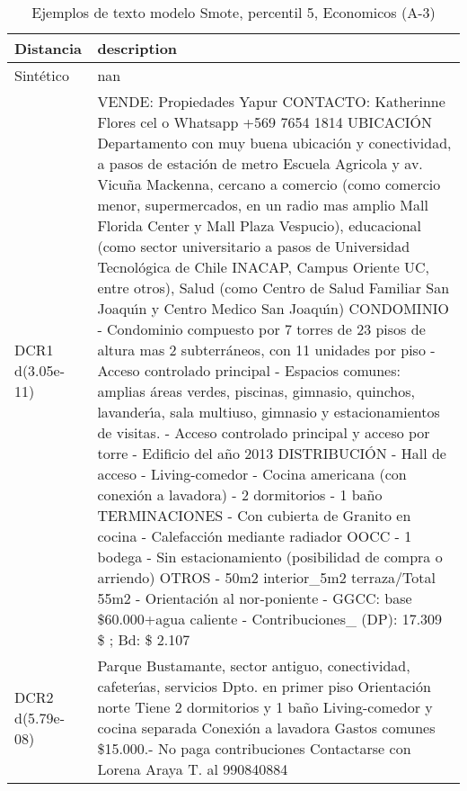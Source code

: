 \begin{table}[H]
\centering
\fontsize{10}{14}\selectfont
\caption{Ejemplos de texto modelo Smote, percentil 5, Economicos (A-3)}
\label{table-example-economicos-a-3-smote-enc-5p-text}
\begin{tabular}{|l|m{35em}|}
\hline
\rowcolor[gray]{0.8}
Distancia & description \\
\hline Sintético & nan \\
\hline DCR1 d(3.05e-11) & VENDE: Propiedades Yapur CONTACTO: Katherinne Flores cel o Whatsapp +569 7654 1814  UBICACI\'ON Departamento con muy buena ubicaci\'on y conectividad, a pasos de estaci\'on de metro Escuela Agricola y av. Vicu\~na Mackenna, cercano a comercio (como comercio menor, supermercados, en un radio mas amplio Mall Florida Center y Mall Plaza Vespucio), educacional (como sector universitario a pasos de Universidad Tecnol\'ogica de Chile INACAP, Campus Oriente UC, entre otros), Salud (como Centro de Salud Familiar San Joaqu{\'\i}n y Centro Medico San Joaqu{\'\i}n)  CONDOMINIO - Condominio compuesto por 7 torres de 23 pisos de altura mas 2 subterr\'aneos, con 11 unidades por piso - Acceso controlado principal  - Espacios comunes: amplias \'areas verdes, piscinas, gimnasio, quinchos, lavander{\'\i}a, sala multiuso, gimnasio y estacionamientos de visitas. - Acceso controlado principal y acceso por torre - Edificio del a\~no 2013  DISTRIBUCI\'ON - Hall de acceso - Living-comedor - Cocina americana (con conexi\'on a lavadora) - 2 dormitorios  - 1 ba\~no   TERMINACIONES - Con cubierta de Granito en cocina - Calefacci\'on mediante radiador  OOCC - 1 bodega  - Sin estacionamiento (posibilidad de compra o arriendo)  OTROS - 50m2 interior\_5m2 terraza/Total 55m2 - Orientaci\'on al nor-poniente - GGCC: base \$60.000+agua caliente - Contribuciones\_ (DP): 17.309 \$ ; Bd: \$ 2.107 \\
\hline DCR2 d(5.79e-08) & Parque Bustamante, sector antiguo, conectividad, cafeter{\'\i}as, servicios Dpto. en primer piso Orientaci\'on norte Tiene 2 dormitorios y 1 ba\~no Living-comedor y cocina separada Conexi\'on a lavadora Gastos comunes \$15.000.- No paga contribuciones  Contactarse con Lorena Araya T. al 990840884 \\
\hline
\end{tabular}
\end{table}
